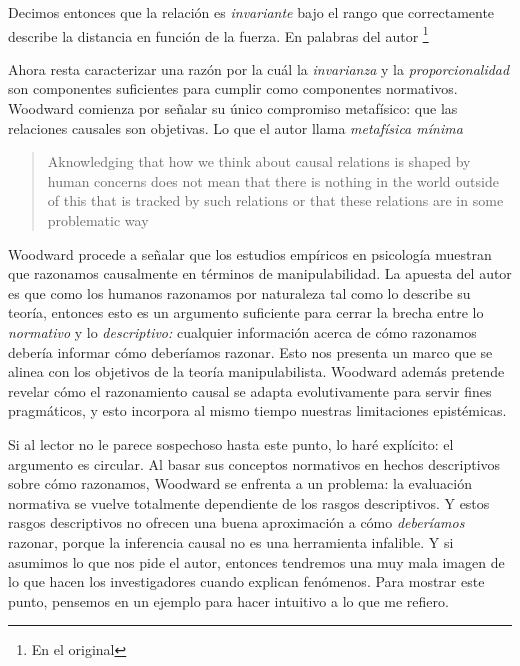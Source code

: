 Decimos entonces  que la relación es \emph{invariante} bajo
el rango que correctamente describe la distancia en función
de la fuerza. En palabras del autor \footnote{
    En el original 
}
\parencite[p.~15]{caushuman} 

Ahora resta caracterizar una razón por la cuál la
\emph{invarianza} y la \emph{proporcionalidad} son
componentes suficientes para cumplir como componentes
normativos. Woodward comienza por señalar su único
compromiso metafísico: que las relaciones causales son
objetivas. Lo que el autor llama \emph{metafísica mínima}

 \begin{quote}
    Aknowledging that how we think about causal relations is
    shaped by human concerns does not mean that there is
    nothing in the world outside of this that is tracked by
    such relations or that these relations are  in some problematic way
    \parencite[p.~12]{caushuman}
  \end{quote}


Woodward procede a señalar que los estudios empíricos en
psicología muestran que razonamos causalmente en términos de
manipulabilidad. La apuesta del autor es que como los
humanos razonamos por naturaleza tal como lo describe su
teoría, entonces esto es un argumento suficiente para cerrar
la brecha entre lo \emph{normativo} y lo \emph{descriptivo:}
cualquier información acerca de cómo razonamos debería
informar cómo deberíamos razonar. Esto nos presenta un
marco que se alinea con los objetivos de la teoría
manipulabilista. Woodward además pretende revelar cómo el
razonamiento causal se adapta evolutivamente para servir
fines pragmáticos, y esto incorpora al mismo tiempo
nuestras limitaciones epistémicas.

Si al lector no le parece sospechoso hasta este punto, lo
haré explícito: el argumento es circular. Al basar sus
conceptos normativos en hechos descriptivos sobre cómo
razonamos, Woodward se enfrenta a un problema: la
evaluación normativa se vuelve totalmente dependiente de los
rasgos descriptivos. Y estos rasgos descriptivos no ofrecen
una buena aproximación a cómo \emph{deberíamos} razonar,
porque la inferencia causal no es una herramienta infalible.
Y si asumimos lo que nos pide el autor, entonces tendremos
una muy mala imagen de lo que hacen los investigadores
cuando explican fenómenos. Para mostrar este punto, pensemos
en un ejemplo para hacer intuitivo a lo que me refiero. 

